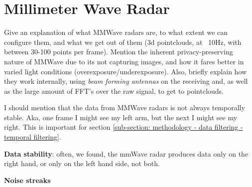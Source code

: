 \section{Millimeter Wave Radar}
\label{section: background - millimeter wave radar}
Give an explanation of what MMWave radars are, to what extent we can configure them, and what we get out of them (3d pointclouds, at ~10Hz, with between 30-100 points per frame).
Mention the inherent privacy-preserving nature of MMWave due to its not capturing images, and how it fares better in varied light conditions (overexposure/underexposure).
Also, briefly explain how they work internally, using \textit{beam forming antennas} on the receiving and, as well as the large amount of FFT's over the raw signal, to get to pointclouds.

I should mention that the data from MMWave radars is not always temporally stable.
Aka, one frame I might see my left arm, but the next I might see my right.
This is important for section \cref{sub-section: methodology - data filtering - temporal filtering}.


\textbf{Data stability}: often, we found, the mmWave radar produces data only on the right hand, or only on the left hand side, not both.

\textbf{Noise streaks}